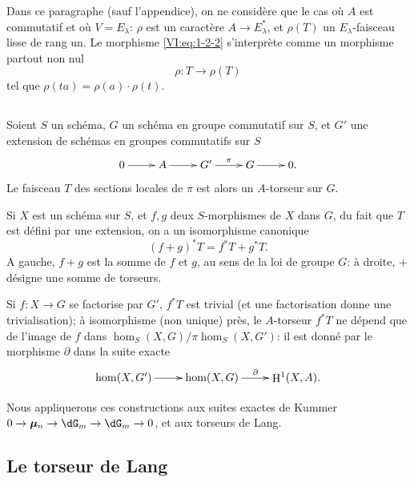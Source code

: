 \documentclass[oneside]{book}
\DeclareMathOperator{\h}{H}
\newcommand{\dmu}{{\bm\mu}}
\theoremstyle{sga-source}
\theoremstyle{sga-source-dash}
\theoremstyle{sga-source-dotdash}
\theoremstyle{sga-source-number-note-dash}
\theoremstyle{sga-source-note-number-dotdash}
\theoremstyle{sga-source-example-dotdash}
\theoremstyle{sga-source-inline-number}
\theoremstyle{sga-source-bare-number}
\theoremstyle{sga-source}
\newcommand{\PrintPage}[1]{}\newcommand{\MathPage}[1]{}\newcommand{\PrintCite}[2]{#1}\newcommand{\var}[3]{#1}
\begin{document}
Dans ce paragraphe (sauf l'appendice), on ne considère que le cas où $A$ 
est commutatif et où $V=E_\lambda$: $\rho$ est un caractère 
$A\to E_\lambda^\ast$, et $\rho(T)$ un $E_\lambda$-faisceau lisse de rang 
un. Le morphisme \eqref{VI:eq:1-2-2} s'interprète comme un morphisme partout 
non nul 
\begin{equation*}\tag{1.2.3}\label{VI:eq:1-2-3}
  \rho:T\to \rho(T) 
\end{equation*}
tel que $\rho(t a) = \rho(a)\cdot\rho(t)$. 





\subsection{}\label{VI:1-3}

Soient $S$ un schéma, $G$ un schéma en groupe commutatif sur $S$, et $G'$ 
une extension de schémas en groupes commutatifs sur $S$
\[\xymatrix{
  0 \ar[r] 
    & A \ar[r] 
    & G' \ar[r]^-\pi 
    & G \ar[r] 
    & 0 \text{.}
}\]
Le faisceau $T$ des sections locales de $\pi$ est alors un $A$-torseur sur 
$G$. 

\PrintPage{171}
Si $X$ est un schéma sur $S$, et $f,g$ deux $S$-morphismes de $X$ dans $G$, 
du fait que $T$ est défini par une extension, on a un isomorphisme 
canonique 
\begin{equation*}\tag{1.3.1}\label{VI:eq:1-3-1}
  (f+g)^\ast T = f^\ast T + g^\ast T \text{.}
\end{equation*}
A gauche, $f+g$ est la somme de $f$ et $g$, au sens de la loi de groupe $G$: 
à droite, $+$ désigne une somme de torseurs. 

Si $f:X\to G$ se factorise par $G'$, $f^\ast T$ est trivial (et une 
factorisation donne une trivialisation); à isomorphisme (non unique) près, 
le $A$-torseur $f^\ast T$ ne dépend que de l'image de $f$ dans 
$\hom_S(X,G)/\pi\hom_S(X,G')$: il est donné par le morphisme $\partial$ dans 
la suite exacte 
\[\xymatrix{
  \hom(X,G') \ar[r] 
    & \hom(X,G) \ar[r]^-\partial 
    & \h^1(X,A) \text{.}
}\]

Nous appliquerons ces constructions aux suites exactes de Kummer 
$0 \to \dmu_n \to \dG_m \to \dG_m \to 0$, et aux torseurs de Lang. 





\subsection{Le torseur de Lang}\label{VI:1-4}
\end{document}
